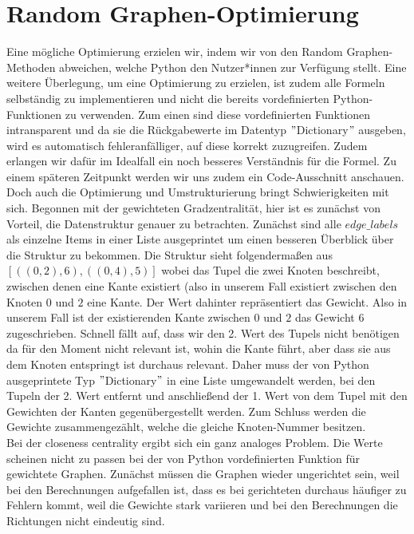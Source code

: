 \section{Random Graphen-Optimierung}
Eine mögliche Optimierung erzielen wir, indem wir von den Random Graphen-Methoden abweichen, welche Python den Nutzer*innen zur Verfügung stellt. Eine weitere Überlegung, um eine Optimierung zu erzielen, ist zudem alle Formeln selbständig zu implementieren und nicht die bereits vordefinierten Python-Funktionen zu verwenden. Zum einen sind diese vordefinierten Funktionen intransparent und da sie die Rückgabewerte im Datentyp $"$Dictionary$"$ ausgeben, wird es automatisch fehleranfälliger, auf diese korrekt zuzugreifen. Zudem erlangen wir dafür im Idealfall ein noch besseres Verständnis für die Formel. Zu einem späteren Zeitpunkt werden wir uns zudem ein Code-Ausschnitt anschauen.
Doch auch die Optimierung und Umstrukturierung bringt Schwierigkeiten mit sich. Begonnen mit der gewichteten Gradzentralität, hier ist es zunächst von Vorteil, die Datenstruktur genauer zu betrachten. Zunächst sind alle $edge\_labels$ als einzelne Items in einer Liste ausgeprintet um einen besseren Überblick über die Struktur zu bekommen. Die Struktur sieht folgendermaßen aus \\
$[((0, 2), 6), ((0, 4), 5)]$ wobei das Tupel die zwei Knoten beschreibt, zwischen denen eine Kante existiert (also in unserem Fall existiert zwischen den Knoten $0$ und $2$ eine Kante. Der Wert dahinter repräsentiert das Gewicht. Also in unserem Fall ist der existierenden Kante zwischen $0$ und $2$ das Gewicht $6$ zugeschrieben. Schnell fällt auf, dass wir den 2. Wert des Tupels nicht benötigen da für den Moment nicht relevant ist, wohin die Kante führt, aber dass sie aus dem Knoten entspringt ist durchaus relevant. Daher muss der von Python ausgeprintete Typ $"$Dictionary$"$ in eine Liste umgewandelt werden, bei den Tupeln der 2. Wert entfernt und anschließend der 1. Wert von dem Tupel mit den Gewichten der Kanten gegenübergestellt werden. Zum Schluss werden die Gewichte zusammengezählt, welche die gleiche Knoten-Nummer besitzen.\\ 
Bei der closeness centrality ergibt sich ein ganz analoges Problem. Die Werte scheinen nicht zu passen bei der von Python vordefinierten Funktion für gewichtete Graphen. Zunächst müssen die Graphen wieder ungerichtet sein, weil bei den Berechnungen aufgefallen ist, dass es bei gerichteten durchaus häufiger zu Fehlern kommt, weil die Gewichte stark variieren und bei den Berechnungen die Richtungen nicht eindeutig sind.
